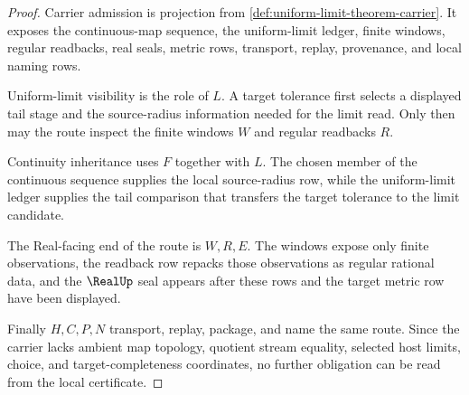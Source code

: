 \begin{proof}
Carrier admission is projection from \autoref{def:uniform-limit-theorem-carrier}. It exposes the continuous-map sequence, the uniform-limit ledger, finite windows, regular readbacks, real seals, metric rows, transport, replay, provenance, and local naming rows.

Uniform-limit visibility is the role of $L$. A target tolerance first selects a displayed tail stage and the source-radius information needed for the limit read. Only then may the route inspect the finite windows $W$ and regular readbacks $R$.

Continuity inheritance uses $F$ together with $L$. The chosen member of the continuous sequence supplies the local source-radius row, while the uniform-limit ledger supplies the tail comparison that transfers the target tolerance to the limit candidate.

The Real-facing end of the route is $W,R,E$. The windows expose only finite observations, the readback row repacks those observations as regular rational data, and the $\RealUp$ seal appears after these rows and the target metric row have been displayed.

Finally $H,C,P,N$ transport, replay, package, and name the same route. Since the carrier lacks ambient map topology, quotient stream equality, selected host limits, choice, and target-completeness coordinates, no further obligation can be read from the local certificate.
\end{proof}

